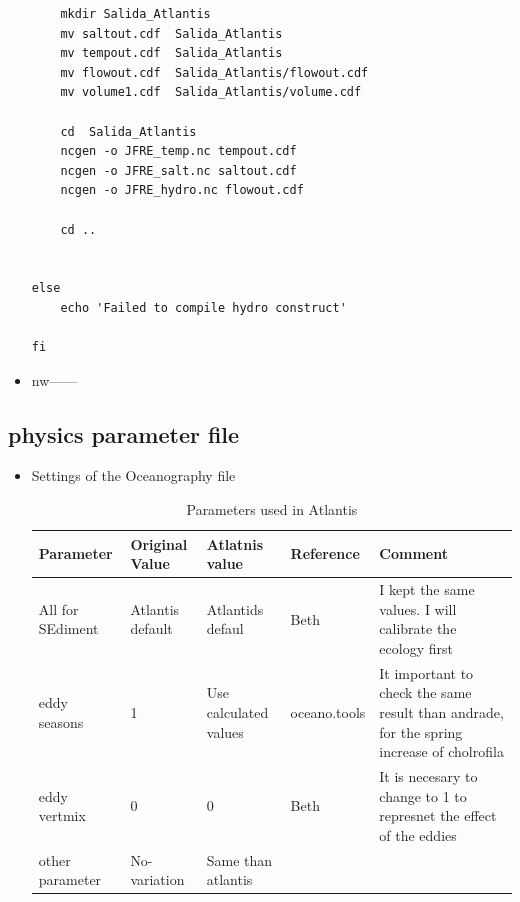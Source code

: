 \documentclass[11pt]{article}
\begin{document}
\begin{itemize}
\begin{verbatim}
    mkdir Salida_Atlantis
    mv saltout.cdf  Salida_Atlantis
    mv tempout.cdf  Salida_Atlantis
    mv flowout.cdf  Salida_Atlantis/flowout.cdf
    mv volume1.cdf  Salida_Atlantis/volume.cdf

    cd  Salida_Atlantis
    ncgen -o JFRE_temp.nc tempout.cdf
    ncgen -o JFRE_salt.nc saltout.cdf
    ncgen -o JFRE_hydro.nc flowout.cdf

    cd ..


else
    echo 'Failed to compile hydro construct'

fi
\end{verbatim}


\item nw------
\label{sec-4-5-1}%
\end{itemize} %
\subsection*{physics parameter file}
\label{sec-4-5}

\begin{itemize}
\item Settings of the Oceanography file
\begin{table}[htb]
\caption{Parameters used in Atlantis}
\begin{center}
\begin{tabular}{lllll}
 Parameter         &  Original Value    &  Atlatnis value         &  Reference     &  Comment                                                                                    \\
\hline
 All for SEdiment  &  Atlantis default  &  Atlantids defaul       &  Beth          &  I kept the same values. I will calibrate the ecology first                                 \\
 eddy seasons      &  1                 &  Use calculated values  &  oceano.tools  &  It important to check the same result than andrade, for the spring increase of cholrofila  \\
 eddy vertmix      &  0                 &  0                      &  Beth          &  It is necesary to change to 1 to represnet the effect of the eddies                        \\
 other parameter   &  No-variation      &  Same than atlantis     &                &                                                                                             \\
\end{tabular}
\end{center}
\end{table}

\end{itemize}
\end{document}
